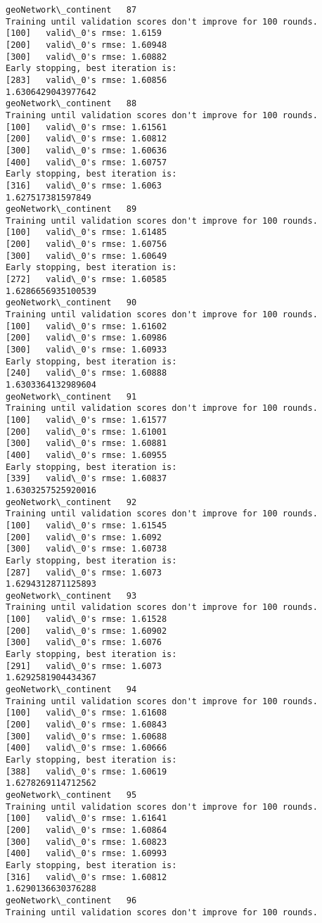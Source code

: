 \documentclass[11pt]{article}
\begin{document}
\begin{Verbatim}[commandchars=\\\{\}]
geoNetwork\_continent   87
Training until validation scores don't improve for 100 rounds.
[100]	valid\_0's rmse: 1.6159
[200]	valid\_0's rmse: 1.60948
[300]	valid\_0's rmse: 1.60882
Early stopping, best iteration is:
[283]	valid\_0's rmse: 1.60856
1.6306429043977642
geoNetwork\_continent   88
Training until validation scores don't improve for 100 rounds.
[100]	valid\_0's rmse: 1.61561
[200]	valid\_0's rmse: 1.60812
[300]	valid\_0's rmse: 1.60636
[400]	valid\_0's rmse: 1.60757
Early stopping, best iteration is:
[316]	valid\_0's rmse: 1.6063
1.627517381597849
geoNetwork\_continent   89
Training until validation scores don't improve for 100 rounds.
[100]	valid\_0's rmse: 1.61485
[200]	valid\_0's rmse: 1.60756
[300]	valid\_0's rmse: 1.60649
Early stopping, best iteration is:
[272]	valid\_0's rmse: 1.60585
1.6286656935100539
geoNetwork\_continent   90
Training until validation scores don't improve for 100 rounds.
[100]	valid\_0's rmse: 1.61602
[200]	valid\_0's rmse: 1.60986
[300]	valid\_0's rmse: 1.60933
Early stopping, best iteration is:
[240]	valid\_0's rmse: 1.60888
1.6303364132989604
geoNetwork\_continent   91
Training until validation scores don't improve for 100 rounds.
[100]	valid\_0's rmse: 1.61577
[200]	valid\_0's rmse: 1.61001
[300]	valid\_0's rmse: 1.60881
[400]	valid\_0's rmse: 1.60955
Early stopping, best iteration is:
[339]	valid\_0's rmse: 1.60837
1.6303257525920016
geoNetwork\_continent   92
Training until validation scores don't improve for 100 rounds.
[100]	valid\_0's rmse: 1.61545
[200]	valid\_0's rmse: 1.6092
[300]	valid\_0's rmse: 1.60738
Early stopping, best iteration is:
[287]	valid\_0's rmse: 1.6073
1.6294312871125893
geoNetwork\_continent   93
Training until validation scores don't improve for 100 rounds.
[100]	valid\_0's rmse: 1.61528
[200]	valid\_0's rmse: 1.60902
[300]	valid\_0's rmse: 1.6076
Early stopping, best iteration is:
[291]	valid\_0's rmse: 1.6073
1.6292581904434367
geoNetwork\_continent   94
Training until validation scores don't improve for 100 rounds.
[100]	valid\_0's rmse: 1.61608
[200]	valid\_0's rmse: 1.60843
[300]	valid\_0's rmse: 1.60688
[400]	valid\_0's rmse: 1.60666
Early stopping, best iteration is:
[388]	valid\_0's rmse: 1.60619
1.6278269114712562
geoNetwork\_continent   95
Training until validation scores don't improve for 100 rounds.
[100]	valid\_0's rmse: 1.61641
[200]	valid\_0's rmse: 1.60864
[300]	valid\_0's rmse: 1.60823
[400]	valid\_0's rmse: 1.60993
Early stopping, best iteration is:
[316]	valid\_0's rmse: 1.60812
1.6290136630376288
geoNetwork\_continent   96
Training until validation scores don't improve for 100 rounds.

\end{Verbatim}
\end{document}
